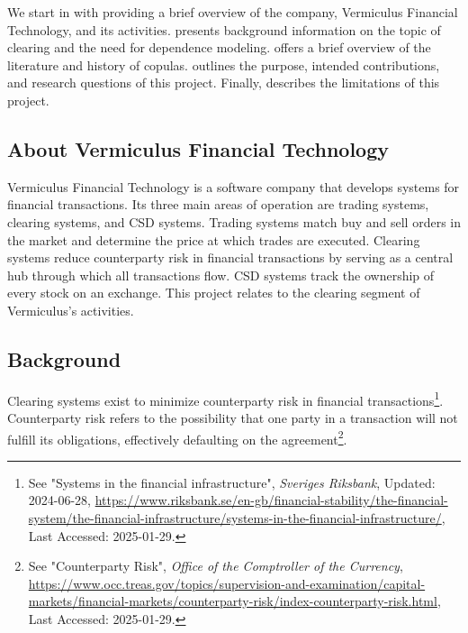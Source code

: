 We start in  with providing a brief overview of the company, Vermiculus Financial Technology, and its activities.  presents background information on the topic of clearing and the need for dependence modeling.  offers a brief overview of the literature and history of copulas.  outlines the purpose, intended contributions, and research questions of this project. Finally,  describes the limitations of this project.

\subsection{About Vermiculus Financial Technology} \label{AboutVFT}
Vermiculus Financial Technology is a software company that develops systems for financial transactions. Its three main areas of operation are trading systems, clearing systems, and \gls{CSD} systems. Trading systems match buy and sell orders in the market and determine the price at which trades are executed. Clearing systems reduce counterparty risk in financial transactions by serving as a central hub through which all transactions flow. \gls{CSD} systems track the ownership of every stock on an exchange. This project relates to the clearing segment of Vermiculus’s activities.

\subsection{Background}\label{Background}
Clearing systems exist to minimize counterparty risk in financial transactions\footnote{See "Systems in the financial infrastructure", \textit{Sveriges Riksbank}, Updated: 2024-06-28, \url{https://www.riksbank.se/en-gb/financial-stability/the-financial-system/the-financial-infrastructure/systems-in-the-financial-infrastructure/}, Last Accessed: 2025-01-29.}. Counterparty risk refers to the possibility that one party in a transaction will not fulfill its obligations, effectively defaulting on the agreement\footnote{See "Counterparty Risk", \textit{Office of the Comptroller of the Currency}, \url{https://www.occ.treas.gov/topics/supervision-and-examination/capital-markets/financial-markets/counterparty-risk/index-counterparty-risk.html}, Last Accessed: 2025-01-29.}.


